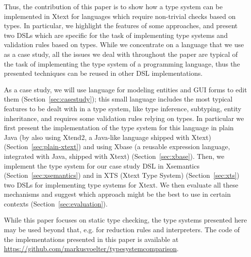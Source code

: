 Thus, the contribution of this paper is to show how a type system can be
implemented in Xtext for languages  which require non-trivial checks based on types. In particular, we
highlight the features of some approaches, and present two DSLs which are
specific for the task of implementing type systems and validation rules based on
types.   While we concentrate on a language that we use as a case study, all the
issues we deal with throughout the paper are typical of the task of implementing
the type system of a programming language, thus the presented techniques can be
reused in other DSL implementations. 

As a case study, we will use language for modeling entities and GUI forms to
edit them (Section~\ref{sec:casestudy}); this small language includes the most
typical features to be dealt with in a type system, like type inference,
subtyping, entity inheritance, and requires some validation rules relying on
types.  In particular we first present the implementation of the type system for
this language in plain Java (by also using Xtend2, a Java-like language shipped
with Xtext) (Section~\ref{sec:plain-xtext}) and using Xbase (a reusable
expression language, integrated with Java, shipped with Xtext)
(Section~\ref{sec:xbase}). 
Then, we implement the type system for our case study DSL in Xsemantics
(Section~\ref{sec:xsemantics}) and in XTS (Xtext Type System)
(Section~\ref{sec:xts}) two DSLs for implementing type systems for Xtext.
We then evaluate all these mechanisms and suggest which approach might be the
best to use in certain contexts (Section~\ref{sec:evaluation}).

While this paper focuses on static type checking, the type systems presented
here may be used beyond that, e.g. for reduction rules and interpreters.  The
code of the implementations presented in this paper is available at
\url{https://github.com/markusvoelter/typesystemcomparison}.


